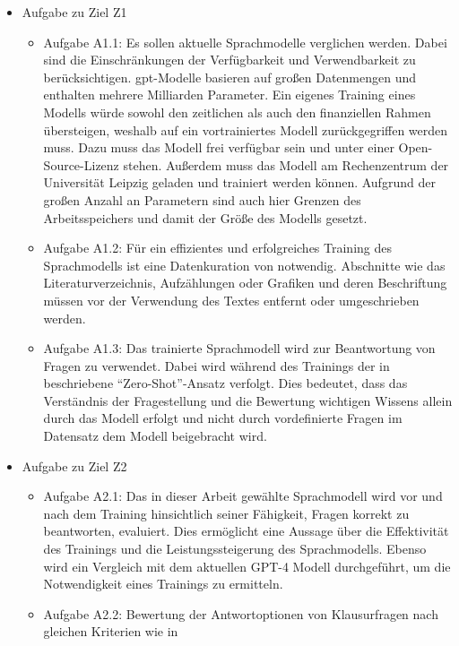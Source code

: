 \begin{itemize}
  \item Aufgabe zu Ziel Z1
        \begin{itemize}
          \item Aufgabe A1.1: Es sollen aktuelle Sprachmodelle verglichen werden. Dabei sind die Einschränkungen der Verfügbarkeit und Verwendbarkeit zu berücksichtigen.
                \ac{gpt}-Modelle basieren auf großen Datenmengen und enthalten mehrere Milliarden Parameter.
                Ein eigenes Training eines Modells würde sowohl den zeitlichen als auch den finanziellen Rahmen übersteigen, weshalb auf ein vortrainiertes Modell zurückgegriffen werden muss.
                Dazu muss das Modell frei verfügbar sein und unter einer Open-Source-Lizenz stehen. Außerdem muss das Modell am Rechenzentrum der Universität Leipzig geladen und trainiert werden können. Aufgrund der großen Anzahl an Parametern sind auch hier Grenzen des Arbeitsspeichers und damit der Größe des Modells gesetzt.
          \item Aufgabe A1.2: Für ein effizientes und erfolgreiches Training des Sprachmodells ist eine Datenkuration von \citet{bb} notwendig.
                Abschnitte wie das Literaturverzeichnis, Aufzählungen oder Grafiken und deren Beschriftung müssen vor der Verwendung des Textes entfernt oder umgeschrieben werden.
          \item Aufgabe A1.3: Das trainierte Sprachmodell wird zur Beantwortung von Fragen zu \citet{bb} verwendet.
                Dabei wird während des Trainings der in \citet{gpt3} beschriebene \enquote{Zero-Shot}-Ansatz verfolgt.
                Dies bedeutet, dass das Verständnis der Fragestellung und die Bewertung wichtigen Wissens allein durch das Modell erfolgt und nicht durch vordefinierte Fragen im Datensatz dem Modell beigebracht wird.
        \end{itemize}
  \item Aufgabe zu Ziel Z2
        \begin{itemize}
          \item Aufgabe A2.1: Das in dieser Arbeit gewählte Sprachmodell wird vor und nach dem Training hinsichtlich seiner Fähigkeit, Fragen korrekt zu beantworten, evaluiert.
                Dies ermöglicht eine Aussage über die Effektivität des Trainings und die Leistungssteigerung des Sprachmodells.\@
                Ebenso wird ein Vergleich mit dem aktuellen GPT-4 Modell \citep{gpt4} durchgeführt, um die Notwendigkeit eines Trainings zu ermitteln.
          \item Aufgabe A2.2: Bewertung der Antwortoptionen von Klausurfragen nach gleichen Kriterien wie in \citet{chatgpt_qas}
        \end{itemize}
\end{itemize}

